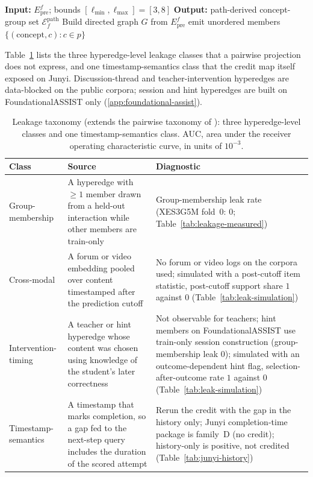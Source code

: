 \documentclass[review,12pt]{elsarticle}
\begin{document}
\begin{algorithm}[H]
\caption{Path-derived concept-group hyperedges from audited
$E_{\mathrm{pre}}^f$.}
\label{alg:concept-hyperedge}
\begin{algorithmic}[1]
\STATE \textbf{Input:} $E_{\mathrm{pre}}^f$; bounds $[\ell_{\min},\ell_{\max}]=[3,8]$
\STATE \textbf{Output:} path-derived concept-group set $\mathcal{E}^{\mathrm{path}}_f$
\STATE Build directed graph $G$ from $E_{\mathrm{pre}}^f$
    \STATE emit unordered members $\{(\text{concept},c):c\in p\}$
  \ENDFOR
\ENDFOR
\end{algorithmic}
\end{algorithm}

Table~\ref{tab:leakage-taxonomy} lists the three hyperedge-level
leakage classes that a pairwise projection does not express, and one
timestamp-semantics class that the credit map itself exposed on Junyi.
Discussion-thread and teacher-intervention hyperedges are data-blocked
on the public corpora; session and hint hyperedges are built on
FoundationalASSIST only (\ref{app:foundational-assist}).

\begin{table}[tbp]
\caption{Leakage taxonomy (extends the pairwise taxonomy of
\cite{daominh2026p0}): three hyperedge-level classes and one
timestamp-semantics class. AUC, area under the receiver operating
characteristic curve, in units of $10^{-3}$.}
\label{tab:leakage-taxonomy}
\centering
\footnotesize
\begin{tabularx}{\textwidth}{@{}
  >{\raggedright\arraybackslash}p{3.35cm}
  >{\raggedright\arraybackslash}X
  >{\raggedright\arraybackslash}X
  @{}}
\toprule
Class & Source & Diagnostic \\
\midrule
Group-membership & A hyperedge with $\ge 1$ member drawn from a held-out
interaction while other members are train-only & Group-membership leak
rate (XES3G5M fold~0: $0$; Table~\ref{tab:leakage-measured}) \\
Cross-modal & A forum or video embedding pooled over content timestamped
after the prediction cutoff & No forum or video logs on the corpora
used; simulated with a post-cutoff item statistic, post-cutoff support
share $1$ against $0$ (Table~\ref{tab:leak-simulation}) \\
Intervention-timing & A teacher or hint hyperedge whose content was
chosen using knowledge of the student's later correctness & Not
observable for teachers; hint members on FoundationalASSIST use
train-only session construction (group-membership leak $0$); simulated
with an outcome-dependent hint flag, selection-after-outcome rate $1$
against $0$ (Table~\ref{tab:leak-simulation}) \\
Timestamp-semantics & A timestamp that marks completion, so a gap fed
to the next-step query includes the duration of the scored attempt &
Rerun the credit with the gap in the history only; Junyi
completion-time package is family~D (no credit); history-only is
positive, not credited (Table~\ref{tab:junyi-history}) \\
\bottomrule
\end{tabularx}
\end{table}
\end{document}
